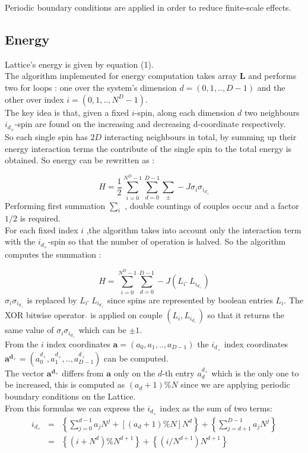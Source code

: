 \documentclass[11pt,a4paper]{article}
\begin{document}
Periodic boundary conditions are applied in order to reduce finite-scale effects.



\newpage
\subsection*{Energy }

Lattice's energy is given by equation (1). \\
The algorithm implemented for energy computation takes array $\mathbf{L}$ and performs two for loops : one over the system's dimension $d = (0,1,..,D-1)$ and the other over index $i = (0,1,..,N^D-1)$. \\
The key idea is that, given a fixed $i$-spin, along each dimension $d$ two neighbours $i_{d_\pm}$-spin are found on the increasing and decreasing d-coordinate respectively.\\
So each single spin has $2D$ interacting neighbours in total, by summing up their energy interaction terms the contribute of the single spin to the total energy is obtained. So energy can be rewritten as :

$$H = \frac{1}{2}\sum_{i=0}^{N^D-1}\sum_{d=0}^{D-1}\sum_{\pm}^{} -J\sigma_i\sigma_{i_{d_\pm}}$$
Performing first summation $\sum_{i}^{}$ , double countings of couples occur and a factor $1/2$ is required. \\
For each fixed index $i$ ,the algorithm takes into account only the interaction term with the
$i_{d_+}$-spin so that the number of operation is halved. So the algorithm computes the summation :

$$H = \sum_{i=0}^{N^D-1}\sum_{d=0}^{D-1}-J(L_i \ \hat{} \ L_{i_{d_+}})$$
$\sigma_i\sigma_{i_{d_+}}$ is replaced by $L_i \ \hat{} \ L_{i_{d_+}}$ since spins are represented by boolean entries $L_i$. The XOR bitwise operator $ \hat{} $ is applied on couple $(L_i,L_{i_{d_+}})$ so that it returns the same value of $\sigma_i\sigma_{i_{d_+}}$ which can be $\pm1$. \\
From the $i$ index coordinates $\mathbf{a} = (a_0,a_1,..,a_{D-1})$ the $i_{d_+}$ index coordinates
$\mathbf{a^{d_+}} = (a^{d_+}_0,a^{d_+}_1,..,a^{d_+}_{D-1})$ can be computed. \\
The vector $\mathbf{a^{d_+}}$ differs from $\mathbf{a}$ only on the $d$-th entry $a^{d_+}_d$ which is the only one to be increased, this is computed as $(a_d+1)\%N$ since we are applying periodic boundary conditions on the Lattice. \\
From this formulas we can express the $i_{d_+}$ index as the sum of two terms:
\begin{eqnarray*}
  i_{d_+} &=& \left\{ \sum_{j = 0}^{d-1}a_jN^j + [(a_d + 1)\%N]N^d \right\} + \left\{ \sum_{j = d+1}^{D-1}a_jN^j \right\}  \\
          &=& \left\{(i + N^d)\%N^{d+1} \right\}  +  \left\{ (i/N^{d+1})N^{d+1}  \right\}
\end{eqnarray*}
\end{document}
